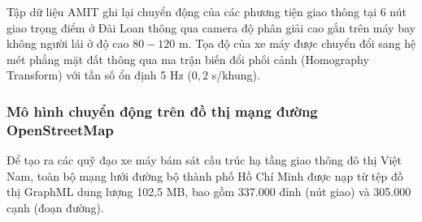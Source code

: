 \hspace{0.5cm} Tập dữ liệu AMIT ghi lại chuyển động của các phương tiện giao thông tại 6 nút giao trọng điểm ở Đài Loan thông qua camera độ phân giải cao gắn trên máy bay không người lái ở độ cao $80 - 120$ m. Tọa độ của xe máy được chuyển đổi sang hệ mét phẳng mặt đất thông qua ma trận biến đổi phối cảnh (Homography Transform) với tần số ổn định 5 Hz ($0{,}2$ s/khung).

\begin{table}[H]
\centering
\caption{Đặc tính động học xe máy tại 6 giao lộ đô thị trong tập dữ liệu AMIT}
\label{tab:amit-traffic-intersections}
\end{table}

\subsubsection{Mô hình chuyển động trên đồ thị mạng đường OpenStreetMap}

\hspace{0.5cm} Để tạo ra các quỹ đạo xe máy bám sát cấu trúc hạ tầng giao thông đô thị Việt Nam, toàn bộ mạng lưới đường bộ thành phố Hồ Chí Minh được nạp từ tệp đồ thị GraphML dung lượng 102,5 MB, bao gồm 337.000 đỉnh (nút giao) và 305.000 cạnh (đoạn đường).

